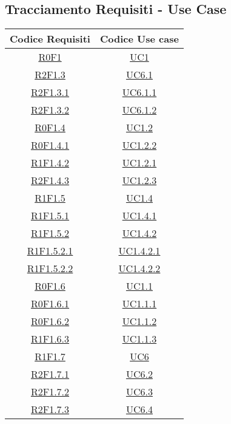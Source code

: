 \subsection{Tracciamento Requisiti - Use Case}
\normalsize
\begin{longtable}{|c|c|}
\hline
\textbf{Codice Requisiti} & \textbf{Codice Use case} \\
\hline
\endhead
\hyperlink{R0F1}{R0F1} & \hyperlink{UC1}{UC1}\\
\hline
\hyperlink{R2F1.3}{R2F1.3} & \hyperlink{UC6.1}{UC6.1}\\
\hline
\hyperlink{R2F1.3.1}{R2F1.3.1} & \hyperlink{UC6.1.1}{UC6.1.1}\\
\hline
\hyperlink{R2F1.3.2}{R2F1.3.2} & \hyperlink{UC6.1.2}{UC6.1.2}\\
\hline
\hyperlink{R0F1.4}{R0F1.4} & \hyperlink{UC1.2}{UC1.2}\\
\hline
\hyperlink{R0F1.4.1}{R0F1.4.1} & \hyperlink{UC1.2.2}{UC1.2.2}\\
\hline
\hyperlink{R1F1.4.2}{R1F1.4.2} & \hyperlink{UC1.2.1}{UC1.2.1}\\
\hline
\hyperlink{R2F1.4.3}{R2F1.4.3} & \hyperlink{UC1.2.3}{UC1.2.3}\\
\hline
\hyperlink{R1F1.5}{R1F1.5} & \hyperlink{UC1.4}{UC1.4}\\
\hline
\hyperlink{R1F1.5.1}{R1F1.5.1} & \hyperlink{UC1.4.1}{UC1.4.1}\\
\hline
\hyperlink{R1F1.5.2}{R1F1.5.2} & \hyperlink{UC1.4.2}{UC1.4.2}\\
\hline
\hyperlink{R1F1.5.2.1}{R1F1.5.2.1} & \hyperlink{UC1.4.2.1}{UC1.4.2.1}\\
\hline
\hyperlink{R1F1.5.2.2}{R1F1.5.2.2} & \hyperlink{UC1.4.2.2}{UC1.4.2.2}\\
\hline
\hyperlink{R0F1.6}{R0F1.6} & \hyperlink{UC1.1}{UC1.1}\\
\hline
\hyperlink{R0F1.6.1}{R0F1.6.1} & \hyperlink{UC1.1.1}{UC1.1.1}\\
\hline
\hyperlink{R0F1.6.2}{R0F1.6.2} & \hyperlink{UC1.1.2}{UC1.1.2}\\
\hline
\hyperlink{R1F1.6.3}{R1F1.6.3} & \hyperlink{UC1.1.3}{UC1.1.3}\\
\hline
\hyperlink{R1F1.7}{R1F1.7} & \hyperlink{UC6}{UC6}\\
\hline
\hyperlink{R2F1.7.1}{R2F1.7.1} & \hyperlink{UC6.2}{UC6.2}\\
\hline
\hyperlink{R2F1.7.2}{R2F1.7.2} & \hyperlink{UC6.3}{UC6.3}\\
\hline
\hyperlink{R2F1.7.3}{R2F1.7.3} & \hyperlink{UC6.4}{UC6.4}\\

\end{longtable}
